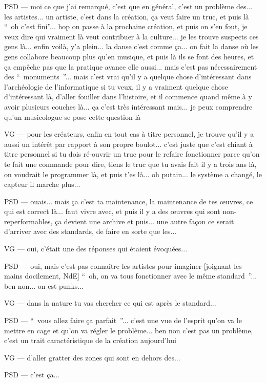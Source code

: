 PSD — moi ce que j'ai remarqué, c'est que en général, c'est un problème des... les artistes... un artiste, c'est dans la création, ça veut faire un truc, et puis là “ oh c'est fini”... hop on passe à la prochaine création, et puis on s'en fout, je veux dire qui vraiment là veut contribuer à la culture... je les trouve suspects ces gens là... enfin voilà, y'a plein... la danse c'est comme ça... on fait la danse où les gens collabore beaucoup plus qu'en musique, et puis là ils se font des heures, et ça empêche pas que la pratique avance elle aussi... mais c'est pas nécessairement des “ monuments ”... mais c'est vrai qu'il y a quelque chose d'intéressant dans l'archéologie de l'informatique si tu veux, il y a vraiment quelque chose d'intéressant là, d'aller fouiller dans l'histoire, et il commence quand même à y avoir plusieurs couches là... ça c'est très intéressant mais... je peux comprendre qu'un musicologue se pose cette question là

VG — pour les créateurs, enfin en tout cas à titre personnel,  je trouve qu'il y a aussi un intérêt par rapport à son propre boulot... c'est juste que c'est chiant à titre personnel si tu dois ré-ouvrir un truc pour le refaire fonctionner parce qu'on te fait une commande pour dire, tiens le truc que tu avais fait il y a trois ans là, on voudrait le programmer là, et puis t'es là... oh putain... le système a changé, le capteur il marche plus...

PSD — ouais... mais ça c'est ta maintenance, la maintenance de tes œuvres, ce qui est correct là... faut vivre avec, et puis il y a des œuvres qui sont non-reperformables, ça devient une archive et puis... une autre façon ce serait d'arriver avec des standards, de faire en sorte que les...

VG — oui, c'était une des réponses qui étaient évoquées...

PSD — oui, mais c'est pas connaître les artistes pour imaginer [joignant les mains docilement, NdE] “ oh, on va tous fonctionner avec le même standard ”... ben non... on est punks...

VG — dans la nature tu vas chercher ce qui est après le standard...

PSD — “ vous allez faire ça parfait ”... c'est une vue de l'esprit qu'on va le mettre en cage et qu'on va régler le problème... ben non c'est pas un problème, c'est un trait caractéristique de la création aujourd'hui

VG — d'aller gratter des zones qui sont en dehors des...

PSD — c'est ça...

